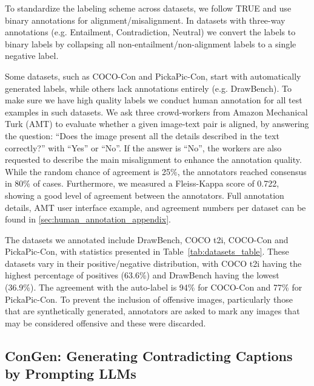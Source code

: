 \documentclass{article}
\begin{document}
To standardize the labeling scheme across datasets, we follow TRUE \citep{honovich-etal-2022-true-evaluating} and use binary annotations for alignment/misalignment. In datasets with three-way annotations (e.g. Entailment, Contradiction, Neutral) we convert the labels to binary labels by collapsing all non-entailment/non-alignment labels to a single negative label.

Some datasets, such as COCO-Con and PickaPic-Con, start with automatically generated labels, while others lack annotations entirely (e.g. DrawBench). To make sure we have high quality labels we conduct human annotation for all test examples in such datasets.
We ask three crowd-workers from Amazon Mechanical Turk (AMT) to evaluate whether a given image-text pair is aligned, by answering the question: ``Does the image present all the details described in the text correctly?'' with ``Yes'' or ``No''. If the answer is ``No'', the workers are also requested to describe the main misalignment to enhance the annotation quality. 
While the random chance of agreement is 25\%, the annotators reached consensus in 80\% of cases. Furthermore, we measured a Fleiss-Kappa \citep{fleiss1971measuring} score of 0.722, showing a good level of agreement between the annotators. Full annotation details, AMT user interface example, and agreement numbers per dataset can be found in \cref{sec:human_annotation_appendix}.

The datasets we annotated include DrawBench, COCO t2i, COCO-Con and PickaPic-Con, with statistics presented in Table~\ref{tab:datasets_table}. These datasets vary in their positive/negative distribution, with COCO t2i having the highest percentage of positives (63.6\%) and DrawBench having the lowest (36.9\%). The agreement with the auto-label is 94\% for COCO-Con and 77\% for PickaPic-Con. 
To prevent the inclusion of offensive images, particularly those that are synthetically generated, annotators are asked to mark any images that may be considered offensive and these were discarded.


\subsection{ConGen: Generating Contradicting Captions by Prompting LLMs} 
\label{ssec:gen_contradictions}
\end{document}
